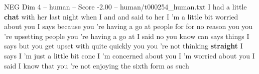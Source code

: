 \begin{textsample}{NEG Dim 4 – human – Score -2.00 – human/t000254\_human.txt}  \label{ex:f4_neg_036}
I had a little \textbf{chat} with her last night when I and and said to her I 'm a little bit worried about you I says because you 're having a go at people for for no reason you you 're upsetting people you 're having a go at I said no you know can says things I says but you get upset with quite quickly you you 're not thinking \textbf{straight} I says I 'm just a little bit conc I 'm concerned about you I 'm worried about you I said I know that you 're not enjoying the sixth form as such

\end{textsample}
